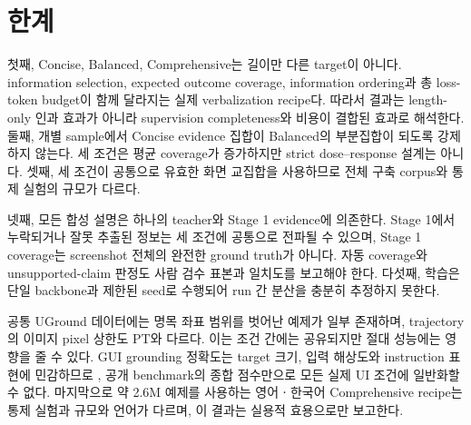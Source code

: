 \section{한계}
\label{sec:limitations}

첫째, Concise, Balanced, Comprehensive는 길이만 다른 target이
아니다. information selection, expected outcome coverage,
information ordering과 총 loss-token budget이 함께 달라지는 실제
verbalization recipe다. 따라서 결과는 length-only 인과 효과가
아니라 supervision completeness와 비용이 결합된 효과로 해석한다.
둘째, 개별 sample에서 Concise evidence 집합이 Balanced의
부분집합이 되도록 강제하지 않는다. 세 조건은 평균 coverage가
증가하지만 strict dose--response 설계는 아니다. 셋째, 세 조건이
공통으로 유효한 화면 교집합을 사용하므로 전체 구축 corpus와 통제
실험의 규모가 다르다.

넷째, 모든 합성 설명은 하나의 teacher와 Stage 1 evidence에
의존한다. Stage 1에서 누락되거나 잘못 추출된 정보는 세 조건에
공통으로 전파될 수 있으며, Stage 1 coverage는 screenshot 전체의
완전한 ground truth가 아니다. 자동 coverage와 unsupported-claim
판정도 사람 검수 표본과 일치도를 보고해야 한다. 다섯째, 학습은
단일 backbone과 제한된 seed로 수행되어 run 간 분산을 충분히
추정하지 못한다.

공통 UGround 데이터에는 명목 좌표 범위를 벗어난 예제가 일부
존재하며, trajectory의 이미지 pixel 상한도 PT와 다르다. 이는
조건 간에는 공유되지만 절대 성능에는 영향을 줄 수 있다. GUI
grounding 정확도는 target 크기, 입력 해상도와 instruction 표현에
민감하므로 \citep{li2025screenspotpro,liu2025uie2i,jandial2026grounders},
공개 benchmark의 종합 점수만으로 모든 실제 UI 조건에 일반화할 수
없다. 마지막으로 약 2.6M 예제를 사용하는 영어ㆍ한국어
Comprehensive recipe는 통제 실험과 규모와 언어가 다르며, 이 결과는
실용적 효용으로만 보고한다.
